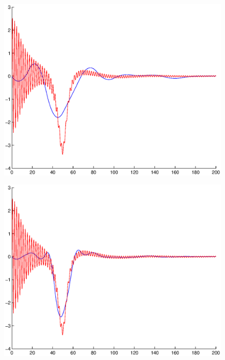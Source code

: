 \documentclass[A4paper,11pt]{article}
\theoremstyle{definition}
\begin{document}
\begin{figure}[H]
\centering
\begin{minipage}{.33\textwidth}
  \centering
  \vspace{0.22cm}
  \includegraphics[scale=0.25]{pictures/Example8/Fig2.eps}
  \label{fig:8_2}
\end{minipage}%
\begin{minipage}{.33\textwidth}
  \centering
  \vspace{0.2cm}
  \includegraphics[scale=0.25]{pictures/Example8/Fig3.eps}
  \label{fig:8_3}
\end{minipage}%
\begin{minipage}{.33\textwidth}

\end{minipage}
\end{figure}
\end{document}
